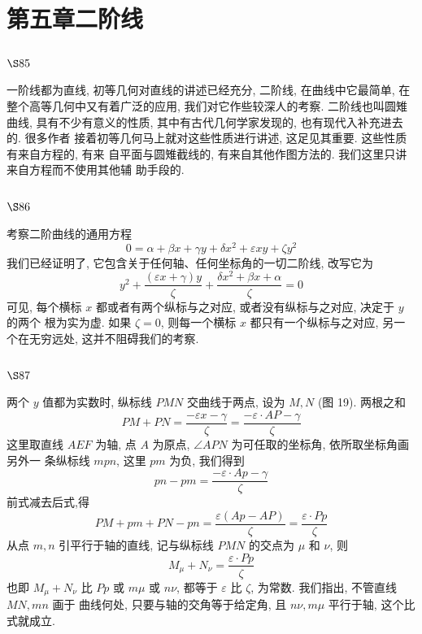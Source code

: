 \chapter{第五章二阶线}

\section{$\S 85$}

一阶线都为直线, 初等几何对直线的讲述已经充分, 二阶线, 在曲线中它最简单, 在 整个高等几何中又有着广泛的应用, 我们对它作些较深人的考察. 二阶线也叫圆雉曲线, 具有不少有意义的性质, 其中有古代几何学家发现的, 也有现代入补充进去的. 很多作者 接着初等几何马上就对这些性质进行讲述, 这足见其重要. 这些性质有来自方程的, 有来 自平面与圆雉截线的, 有来自其他作图方法的. 我们这里只讲来自方程而不使用其他辅 助手段的.

\section{$\S 86$}

考察二阶曲线的通用方程
\[
0=\alpha+\beta x+\gamma y+\delta x^{2}+\varepsilon x y+\zeta y^{2}
\]
我们已经证明了, 它包含关于任何轴、任何坐标角的一切二阶线, 改写它为
\[
y^{2}+\frac{(\varepsilon x+\gamma) y}{\zeta}+\frac{\delta x^{2}+\beta x+\alpha}{\zeta}=0
\]
可见, 每个横标 $x$ 都或者有两个纵标与之对应, 或者没有纵标与之对应, 决定于 $y$ 的两个 根为实为虚. 如果 $\zeta=0$, 则每一个横标 $x$ 都只有一个纵标与之对应, 另一个在无穷远处, 这并不阻碍我们的考察.

\section{$\S 87$}

两个 $y$ 值都为实数时, 纵标线 $P M N$ 交曲线于两点, 设为 $M, N$ (图 19). 两根之和
\[
P M+P N=\frac{-\varepsilon x-\gamma}{\zeta}=\frac{-\varepsilon \cdot A P-\gamma}{\zeta}
\]
这里取直线 $A E F$ 为轴, 点 $A$ 为原点, $\angle A P N$ 为可任取的坐标角, 依所取坐标角画另外一 条纵标线 $m p n$, 这里 $p m$ 为负, 我们得到
\[
p n-p m=\frac{-\varepsilon \cdot A p-\gamma}{\zeta}
\]
前式减去后式,得
\[
P M+p m+P N-p n=\frac{\varepsilon(A p-A P)}{\zeta}=\frac{\varepsilon \cdot P p}{\zeta}
\]
从点 $m, n$ 引平行于轴的直线, 记与纵标线 $P M N$ 的交点为 $\mu$ 和 $\nu$, 则
\[
M_{\mu}+N_{\nu}=\frac{\varepsilon \cdot P p}{\zeta}
\]
也即 $M_{\mu}+N_{\nu}$ 比 $P p$ 或 $m \mu$ 或 $n \nu$, 都等于 $\varepsilon$ 比 $\zeta$, 为常数. 我们指出, 不管直线 $M N, m n$ 画于 曲线何处, 只要与轴的交角等于给定角, 且 $n \nu, m \mu$ 平行于轴, 这个比式就成立.


